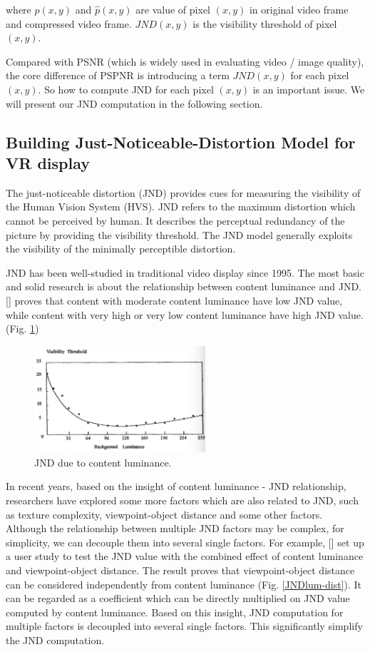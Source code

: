 where $p(x, y)$ and $\hat{p}(x, y)$ are value of pixel $(x, y)$ in original video frame and compressed video frame. $JND(x, y)$ is the visibility threshold of pixel $(x, y)$.

Compared with PSNR (which is widely used in evaluating video / image quality), the core difference of PSPNR is introducing a term $JND(x, y)$ for each pixel $(x, y)$. So how to compute JND for each pixel $(x, y)$ is an important issue. We will present our JND computation in the following section.

\subsection{Building Just-Noticeable-Distortion Model for VR display}
The just-noticeable distortion (JND) provides cues for measuring the visibility of the Human Vision System (HVS). JND refers to the maximum distortion which cannot be perceived by human. It describes the perceptual redundancy of the picture by providing the visibility threshold. The JND model generally exploits the visibility of the minimally perceptible distortion.

JND has been well-studied in traditional video display since 1995. The most basic and solid research is about the relationship between content luminance and JND. [] proves that content with moderate content luminance have low JND value, while content with very high or very low content luminance have high JND value. (Fig. \ref{JNDluminance})

\begin{figure}
  \centering
  \includegraphics[width=2.5in]{images/backgroundluminance.jpg}
  \caption{JND due to content luminance.}
  \label{JNDluminance}
  \end{figure}

In recent years, based on the insight of content luminance - JND relationship, researchers have explored some more factors which are also related to JND, such as texture complexity, viewpoint-object distance and some other factors. Although the relationship between multiple JND factors may be complex, for simplicity, we can decouple them into several single factors. For example, [] set up a user study to test the JND value with the combined effect of content luminance and viewpoint-object distance. The result proves that viewpoint-object distance can be considered independently from content luminance (Fig. \ref{JNDlum-dist}). It can be regarded as a coefficient which can be directly multiplied on JND value computed by content luminance. Based on this insight, JND computation for multiple factors is decoupled into several single factors. This significantly simplify the JND computation.

